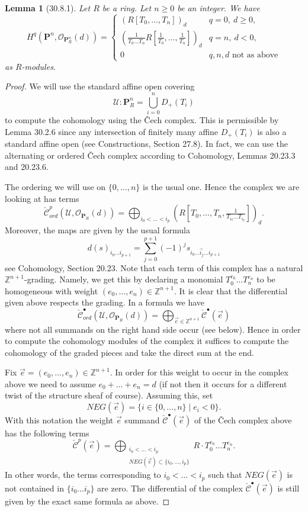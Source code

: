 \documentclass[UTF8,11pt]{ctexart}
\newtheorem*{lemma}{Lemma}
\theoremstyle{definition}
\newcommand{\Z}{\mathbb Z}
\begin{document}
\begin{lemma}[30.8.1]
Let $R$ be a ring. Let $n\geq0$ be an integer. We have
\[
H^q(\mathbf P^n,\mathcal O_{\mathbf P_R^n}(d))=
\begin{cases}
(R[T_0,\ldots,T_n])_d& q=0,\ d\geq0,\\
\left(\frac1{T_0\ldots T_n}R[\frac1{T_0},\ldots,\frac1{T_n}]\right)_d& q=n,\ d<0,\\
0& q,n,d\text{ not as above}
\end{cases}
\]
as $R$-modules.
\end{lemma}
\begin{proof}
We will use the standard affine open covering
\[
\mathcal U:\mathbf P_R^n=\bigcup_{i=0}^nD_+(T_i)
\]
to compute the cohomology using the \v Cech complex. This is permissible by Lemma 30.2.6 since any intersection of finitely many affine $D_+(T_i)$ is also a standard affine open (see Constructions, Section 27.8). In fact, we can use the alternating or ordered \v Cech complex according to Cohomology, Lemmas 20.23.3 and 20.23.6.

The ordering we will use on $\{0,\ldots,n\}$ is the usual one. Hence the complex we are looking at has terms
\[
\check{\mathcal C}_{ord}^p(\mathcal U,\mathcal O_{\mathbf P_R}(d))
=\bigoplus_{i_0<\ldots<i_p}(R[T_0,\ldots,T_n,\tfrac1{T_{i_0}\ldots T_{i_p}}])_d.
\]
Moreover, the maps are given by the usual formula
\[
d(s)_{i_0\ldots i_{p+1}}=\sum_{j=0}^{p+1}(-1)^js_{i_0\ldots\widehat{i_j}\ldots i_{p+1}}
\]
see Cohomology, Section 20.23. Note that each term of this complex has a natural $\Z^{n+1}$-grading. Namely, we get this by declaring a monomial $T_0^{e_0}\ldots T_n^{e_n}$ to be homogeneous with weight $(e_0,\ldots,e_n)\in\Z^{n+1}$. It is clear that the differential given above respects the grading. In a formula we have
\[
\check{\mathcal C}_{ord}^{\bullet}(\mathcal U,\mathcal O_{\mathbf P_R}(d))
=\bigoplus_{\vec e\in\Z^{n+1}}\check{\mathcal C}^{\bullet}(\vec e)
\]
where not all summands on the right hand side occur (see below). Hence in order to compute the cohomology modules of the complex it suffices to compute the cohomology of the graded pieces and take the direct sum at the end.

Fix $\vec e=(e_0,\ldots,e_n)\in\Z^{n+1}$. In order for this weight to occur in the complex above we need to assume $e_0+\ldots+e_n=d$ (if not then it occurs for a different twist of the structure sheaf of course). Assuming this, set
\[
NEG(\vec e)=\{i\in\{0,\ldots,n\}\mid e_i<0\}.
\]
With this notation the weight $\vec e$ summand $\check{\mathcal C}^{\bullet}(\vec e)$ of the \v Cech complex above has the following terms
\[
\check{\mathcal C}^{p}(\vec e)
=\bigoplus_{\substack{i_0<\ldots<i_p\\NEG(\vec e)\subset\{i_0,\ldots,i_p\}}}
R\cdot T_0^{e_0}\ldots T_n^{e_n}.
\]
In other words, the terms corresponding to $i_0<\ldots<i_p$ such that $NEG(\vec e)$ is not contained in $\{i_0\ldots i_p\}$ are zero. The differential of the complex $\check{\mathcal C}^{\bullet}(\vec e)$ is still given by the exact same formula as above.


\end{proof}
\end{document}
